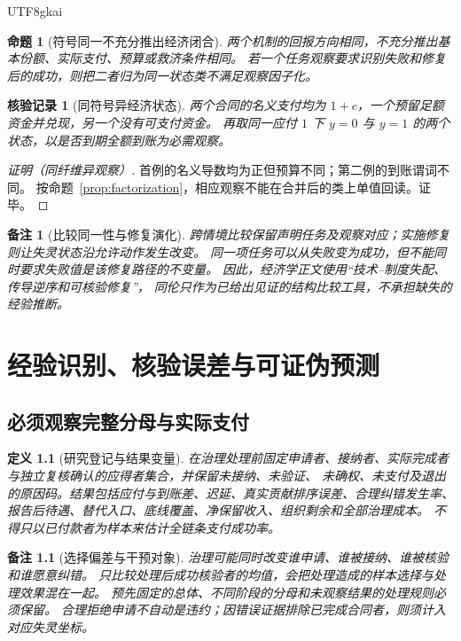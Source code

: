 \documentclass[12pt,a4paper,openany]{report}
\newtheorem{definition}{定义}[chapter]
\newtheorem{proposition}{命题}[chapter]
\newtheorem{remark}{备注}[chapter]
\newtheorem{Certificate}{核验记录}[chapter]
\begin{document}
\begin{CJK*}{UTF8}{gkai}
\begin{proposition}[符号同一不充分推出经济闭合]
\label{prop:sign-insufficient}
两个机制的回报方向相同，不充分推出基本份额、实际支付、预算或救济条件相同。
若一个任务观察要求识别失败和修复后的成功，则把二者归为同一状态类不满足观察因子化。
\end{proposition}
\begin{Certificate}[同符号异经济状态]
两个合同的名义支付均为 $1+c$，一个预留足额资金并兑现，另一个没有可支付资金。
再取同一应付 $1$ 下 $y=0$ 与 $y=1$ 的两个状态，以是否到期全额到账为必需观察。
\end{Certificate}
\begin{proof}[证明（同纤维异观察）]
首例的名义导数均为正但预算不同；第二例的到账谓词不同。
按命题~\ref{prop:factorization}，相应观察不能在合并后的类上单值回读。证毕。
\end{proof}

\begin{remark}[比较同一性与修复演化]
跨情境比较保留声明任务及观察对应；实施修复则让失灵状态沿允许动作发生改变。
同一项任务可以从失败变为成功，但不能同时要求失败值是该修复路径的不变量。
因此，经济学正文使用“技术--制度失配、传导逆序和可核验修复”，
同伦只作为已给出见证的结构比较工具，不承担缺失的经验推断。
\end{remark}

\chapter{经验识别、核验误差与可证伪预测}
\label{chap:empirical}

\section{必须观察完整分母与实际支付}

\begin{definition}[研究登记与结果变量]
\label{def:study}
在治理处理前固定申请者、接纳者、实际完成者与独立复核确认的应得者集合，并保留未接纳、未验证、
未确权、未支付及退出的原因码。结果包括应付与到账差、迟延、真实贡献排序误差、合理纠错发生率、
报告后待遇、替代入口、底线覆盖、净保留收入、组织剩余和全部治理成本。
不得只以已付款者为样本来估计全链条支付成功率。
\end{definition}

\begin{remark}[选择偏差与干预对象]
治理可能同时改变谁申请、谁被接纳、谁被核验和谁愿意纠错。
只比较处理后成功核验者的均值，会把处理造成的样本选择与处理效果混在一起。
预先固定的总体、不同阶段的分母和未观察结果的处理规则必须保留。
合理拒绝申请不自动是违约；因错误证据排除已完成合同者，则须计入对应失灵坐标。
\end{remark}


\end{CJK*}
\end{document}
